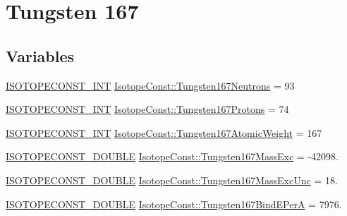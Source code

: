 \hypertarget{group___isotope_const-_tungsten-_w167}{}\section{Tungsten 167}
\label{group___isotope_const-_tungsten-_w167}
\subsection*{Variables}
\begin{DoxyCompactItemize}
\item 
\mbox{\hyperlink{group___isotope_const-_macros_ga5f18360b3e99483a35c32d789e62621c}{I\+S\+O\+T\+O\+P\+E\+C\+O\+N\+S\+T\+\_\+\+I\+NT}} \mbox{\hyperlink{group___isotope_const-_tungsten-_w167_ga0a1c5e1e9ce3d71cbbffe0fd04053883}{Isotope\+Const\+::\+Tungsten167\+Neutrons}} = 93
\item 
\mbox{\hyperlink{group___isotope_const-_macros_ga5f18360b3e99483a35c32d789e62621c}{I\+S\+O\+T\+O\+P\+E\+C\+O\+N\+S\+T\+\_\+\+I\+NT}} \mbox{\hyperlink{group___isotope_const-_tungsten-_w167_gaff0d23693a14f9124a00f765e703e770}{Isotope\+Const\+::\+Tungsten167\+Protons}} = 74
\item 
\mbox{\hyperlink{group___isotope_const-_macros_ga5f18360b3e99483a35c32d789e62621c}{I\+S\+O\+T\+O\+P\+E\+C\+O\+N\+S\+T\+\_\+\+I\+NT}} \mbox{\hyperlink{group___isotope_const-_tungsten-_w167_ga26959663aad461c472a428c2f3cb3898}{Isotope\+Const\+::\+Tungsten167\+Atomic\+Weight}} = 167
\item 
\mbox{\hyperlink{group___isotope_const-_macros_ga8f45a7272ce02c0b4c65c44636ed719a}{I\+S\+O\+T\+O\+P\+E\+C\+O\+N\+S\+T\+\_\+\+D\+O\+U\+B\+LE}} \mbox{\hyperlink{group___isotope_const-_tungsten-_w167_ga594e788214e2025d11c7768a5effd8a8}{Isotope\+Const\+::\+Tungsten167\+Mass\+Exc}} = -\/42098.
\item 
\mbox{\hyperlink{group___isotope_const-_macros_ga8f45a7272ce02c0b4c65c44636ed719a}{I\+S\+O\+T\+O\+P\+E\+C\+O\+N\+S\+T\+\_\+\+D\+O\+U\+B\+LE}} \mbox{\hyperlink{group___isotope_const-_tungsten-_w167_ga1f35eded664c9f8a38ce3e61b0688682}{Isotope\+Const\+::\+Tungsten167\+Mass\+Exc\+Unc}} = 18.
\item 
\mbox{\hyperlink{group___isotope_const-_macros_ga8f45a7272ce02c0b4c65c44636ed719a}{I\+S\+O\+T\+O\+P\+E\+C\+O\+N\+S\+T\+\_\+\+D\+O\+U\+B\+LE}} \mbox{\hyperlink{group___isotope_const-_tungsten-_w167_ga78fd58ce392f6d53023adcdcad06cc74}{Isotope\+Const\+::\+Tungsten167\+Bind\+E\+PerA}} = 7976.
\item 

\end{DoxyCompactItemize}
